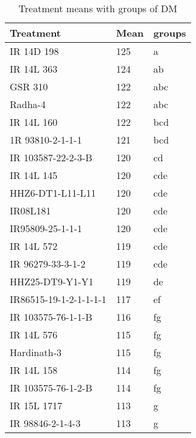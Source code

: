 \documentclass[]{article}
\begin{document}
\begin{longtable}{lll}
\caption{\label{tab:two-fac-groups-tab2}Treatment means with groups of DM}\\
\toprule
Treatment & Mean & groups\\
\midrule
\rowcolor{gray!6}  IR 14D 198 & 125 & a\\
IR 14L 363 & 124 & ab\\
\rowcolor{gray!6}  GSR 310 & 122 & abc\\
Radha-4 & 122 & abc\\
\rowcolor{gray!6}  IR 14L 160 & 122 & bcd\\
\addlinespace
1R 93810-2-1-1-1 & 121 & bcd\\
\rowcolor{gray!6}  IR 103587-22-2-3-B & 120 & cd\\
IR 14L 145 & 120 & cde\\
\rowcolor{gray!6}  HHZ6-DT1-L11-L11 & 120 & cde\\
IR08L181 & 120 & cde\\
\addlinespace
\rowcolor{gray!6}  IR95809-25-1-1-1 & 120 & cde\\
IR 14L 572 & 119 & cde\\
\rowcolor{gray!6}  IR 96279-33-3-1-2 & 119 & cde\\
HHZ25-DT9-Y1-Y1 & 119 & de\\
\rowcolor{gray!6}  IR86515-19-1-2-1-1-1-1 & 117 & ef\\
\addlinespace
IR 103575-76-1-1-B & 116 & fg\\
\rowcolor{gray!6}  IR 14L 576 & 115 & fg\\
Hardinath-3 & 115 & fg\\
\rowcolor{gray!6}  IR 14L 158 & 114 & fg\\
IR 103575-76-1-2-B & 114 & fg\\
\addlinespace
\rowcolor{gray!6}  IR 15L 1717 & 113 & g\\
IR 98846-2-1-4-3 & 113 & g\\
\bottomrule
\end{longtable}
\endgroup{}
\begingroup\fontsize{12}{14}\selectfont
\end{document}
